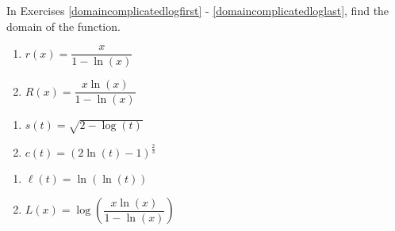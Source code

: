In Exercises \ref{domaincomplicatedlogfirst} - \ref{domaincomplicatedloglast},  find the domain of the function.

\begin{multicols}{2} 
\begin{enumerate}
\setcounter{enumi}{\value{HW}}

\item \label{domaincomplicatedlogfirst}  $r(x) =   \dfrac{x}{1 - \ln(x)}$  %

\item   $R(x) = \dfrac{x \ln(x)}{1 - \ln(x)}$   %

\setcounter{HW}{\value{enumi}}
\end{enumerate}
\end{multicols}


\begin{multicols}{2} 
\begin{enumerate}
\setcounter{enumi}{\value{HW}}

\item     $s(t) = \sqrt{2 - \log(t)}$   %
\item     $c(t) =  (2 \ln(t) -1)^{\frac{2}{3}}$  %

\setcounter{HW}{\value{enumi}}
\end{enumerate}
\end{multicols}

\begin{multicols}{2} 
\begin{enumerate}
\setcounter{enumi}{\value{HW}}
  
\item     $\ell(t) = \ln( \ln(t))$   %

\item  \label{domaincomplicatedloglast}    $L(x) = \log\left( \dfrac{x \ln(x)}{1 - \ln(x)} \right)$  %


\setcounter{HW}{\value{enumi}}
\end{enumerate}
\end{multicols}


